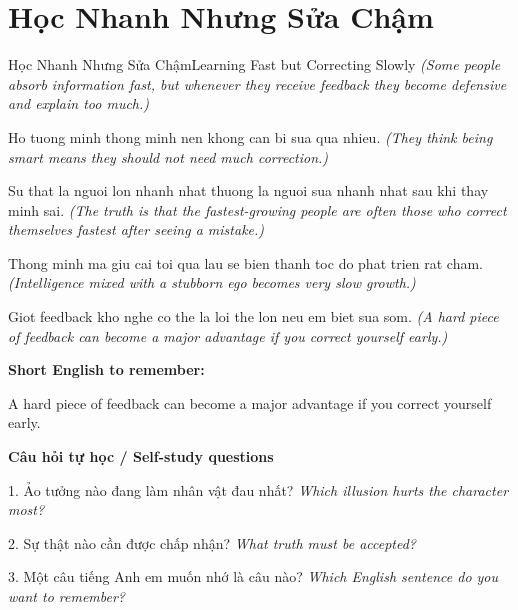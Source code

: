 \section{Học Nhanh Nhưng Sửa Chậm}
\begin{truyen}{Học Nhanh Nhưng Sửa Chậm}{Learning Fast but Correcting Slowly}
\textit{(Some people absorb information fast, but whenever they receive feedback they become defensive and explain too much.)}

Ho tuong minh thong minh nen khong can bi sua qua nhieu.
\textit{(They think being smart means they should not need much correction.)}

Su that la nguoi lon nhanh nhat thuong la nguoi sua nhanh nhat sau khi thay minh sai.
\textit{(The truth is that the fastest-growing people are often those who correct themselves fastest after seeing a mistake.)}

Thong minh ma giu cai toi qua lau se bien thanh toc do phat trien rat cham.
\textit{(Intelligence mixed with a stubborn ego becomes very slow growth.)}

\end{truyen}

\begin{baihoc}
Giot feedback kho nghe co the la loi the lon neu em biet sua som.
\textit{(A hard piece of feedback can become a major advantage if you correct yourself early.)}
\end{baihoc}

\begin{ghinhoanh}
\textbf{Short English to remember:}

A hard piece of feedback can become a major advantage if you correct yourself early.

\end{ghinhoanh}

\begin{tuhocnhanh}
\textbf{Câu hỏi tự học / Self-study questions}

1. Ảo tưởng nào đang làm nhân vật đau nhất? \textit{Which illusion hurts the character most?}

2. Sự thật nào cần được chấp nhận? \textit{What truth must be accepted?}

3. Một câu tiếng Anh em muốn nhớ là câu nào? \textit{Which English sentence do you want to remember?}
\end{tuhocnhanh}
\ngancach

